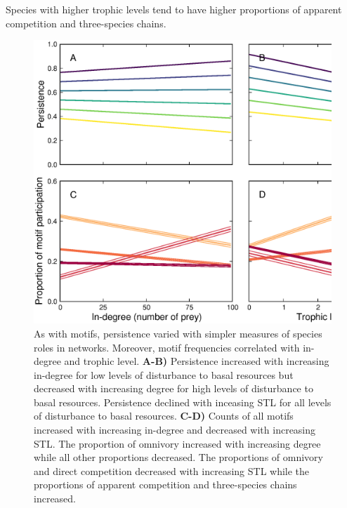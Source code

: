 \documentclass[12pt]{article}
\begin{document}
\begin{spacing}{2.0}
            Species with higher trophic levels tend to have higher proportions of apparent competition and three-species chains. 
            

            \begin{figure}
                \centering
                \includegraphics[width=\textwidth]{figures/roles_vs_TL.eps}
                \caption{As with motifs, persistence varied with simpler measures of species roles in networks. Moreover, motif frequencies correlated with in-degree and trophic level. \textbf{A-B)} Persistence increased with increasing in-degree for low levels of disturbance to basal resources but decreased with increasing degree for high levels of disturbance to basal resources.
                Persistence declined with inceasing STL for all levels of disturbance to basal resources.
                \textbf{C-D)} Counts of all motifs increased with increasing in-degree and decreased with increasing STL. The proportion of omnivory increased with increasing degree while all other proportions decreased. The proportions of omnivory and direct competition decreased with increasing STL while the proportions of apparent competition and three-species chains increased.}
                \label{fig:motifs_vs_TL_and_deg}
            \end{figure}

 

\clearpage



\end{spacing}
\end{document}
